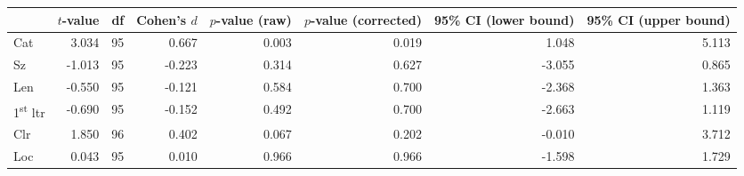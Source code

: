 \begin{tabular}{lrrrrrrr}
\toprule
{} & $t$-value & df & Cohen's $d$ & $p$-value (raw) & $p$-value (corrected) & 95\% CI (lower bound) & 95\% CI (upper bound) \\
\midrule
Cat                       &     3.034 & 95 &       0.667 &           0.003 &                 0.019 &                 1.048 &                 5.113 \\
Sz                        &    -1.013 & 95 &      -0.223 &           0.314 &                 0.627 &                -3.055 &                 0.865 \\
Len                       &    -0.550 & 95 &      -0.121 &           0.584 &                 0.700 &                -2.368 &                 1.363 \\
1\textsuperscript{st} ltr &    -0.690 & 95 &      -0.152 &           0.492 &                 0.700 &                -2.663 &                 1.119 \\
Clr                       &     1.850 & 96 &       0.402 &           0.067 &                 0.202 &                -0.010 &                 3.712 \\
Loc                       &     0.043 & 95 &       0.010 &           0.966 &                 0.966 &                -1.598 &                 1.729 \\
\bottomrule
\end{tabular}

